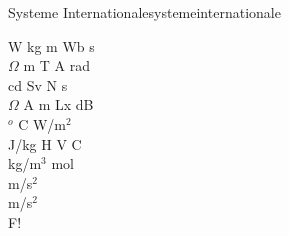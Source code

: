 \begin{song}{Systeme Internationale}{systemeinternationale}
\begin{vers}
W kg m Wb s\\
$\Omega$ m T A rad\\
cd Sv N s\\
$\Omega$ A m Lx dB\\
$^o$ C W/m$^2$\\
J/kg H V C\\
kg/m$^3$ mol\\
m/s$^2$\\
m/s$^2$\\
F!\\
\end{vers}
\end{song}
